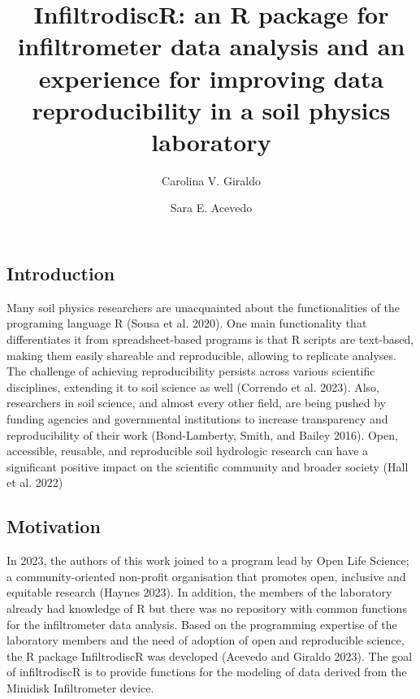 \documentclass[
]{article}
\title{InfiltrodiscR: an R package for infiltrometer data analysis and
an experience for improving data reproducibility in a soil physics
laboratory}
\author[1,2]{Carolina V. Giraldo}
\author[1]{Sara E. Acevedo}
\affil[1]{Pontificia Universidad Católica de Chile}
\affil[2]{Centro de Desarrollo Urbano Sustentable (CEDEUS)}
\date{}
\begin{document}
\maketitle
\ifdefined\Shaded\renewenvironment{Shaded}{\begin{tcolorbox}[frame hidden, boxrule=0pt, breakable, sharp corners, interior hidden, borderline west={3pt}{0pt}{shadecolor}, enhanced]}{\end{tcolorbox}}\fi

\hypertarget{introduction}{%
\subsection{Introduction}\label{introduction}}

Many soil physics researchers are unacquainted about the functionalities
of the programing language R (Sousa et al. 2020). One main functionality
that differentiates it from spreadsheet-based programs is that R scripts
are text-based, making them easily shareable and reproducible, allowing
to replicate analyses. The challenge of achieving reproducibility
persists across various scientific disciplines, extending it to soil
science as well (Correndo et al. 2023). Also, researchers in soil
science, and almost every other field, are being pushed by funding
agencies and governmental institutions to increase transparency and
reproducibility of their work (Bond-Lamberty, Smith, and Bailey 2016).
Open, accessible, reusable, and reproducible soil hydrologic research
can have a significant positive impact on the scientific community and
broader society (Hall et al. 2022)

\hypertarget{motivation}{%
\subsection{Motivation}\label{motivation}}

In 2023, the authors of this work joined to a program lead by Open Life
Science; a community-oriented non-profit organisation that promotes
open, inclusive and equitable research (Haynes 2023). In addition, the
members of the laboratory already had knowledge of R but there was no
repository with common functions for the infiltrometer data analysis.
Based on the programming expertise of the laboratory members and the
need of adoption of open and reproducible science, the R package
InfiltrodiscR was developed (Acevedo and Giraldo 2023). The goal of
infiltrodiscR is to provide functions for the modeling of data derived
from the Minidisk Infiltrometer device.
\end{document}
